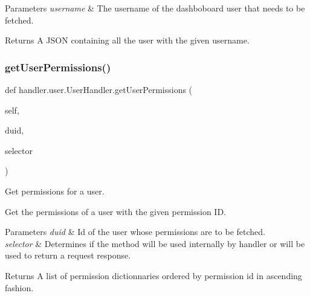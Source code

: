 \begin{DoxyParams}{Parameters}
{\em username} & The username of the dashboboard user that needs to be fetched.\\
\hline
\end{DoxyParams}
\begin{DoxyReturn}{Returns}
A J\+S\+ON containing all the user with the given username. 
\end{DoxyReturn}
\mbox{\label{classhandler_1_1user_1_1_user_handler_aa8e4dd85347c5126bb48383db010fa39}} 
\subsubsection{\texorpdfstring{get\+User\+Permissions()}{getUserPermissions()}}
{\footnotesize\ttfamily def handler.\+user.\+User\+Handler.\+get\+User\+Permissions (\begin{DoxyParamCaption}\item[{}]{self,  }\item[{}]{duid,  }\item[{}]{selector }\end{DoxyParamCaption})}



Get permissions for a user. 

Get the permissions of a user with the given permission ID.


\begin{DoxyParams}{Parameters}
{\em duid} & Id of the user whose permissions are to be fetched. \\
\hline
{\em selector} & Determines if the method will be used internally by handler or will be used to return a request response. \\
\hline
\end{DoxyParams}
\begin{DoxyReturn}{Returns}
A list of permission dictionnaries ordered by permission id in ascending fashion. 
\end{DoxyReturn}
\mbox{\label{classhandler_1_1user_1_1_user_handler_a83f742752a1b3d3bbf68c3cabc877f3c}} 
